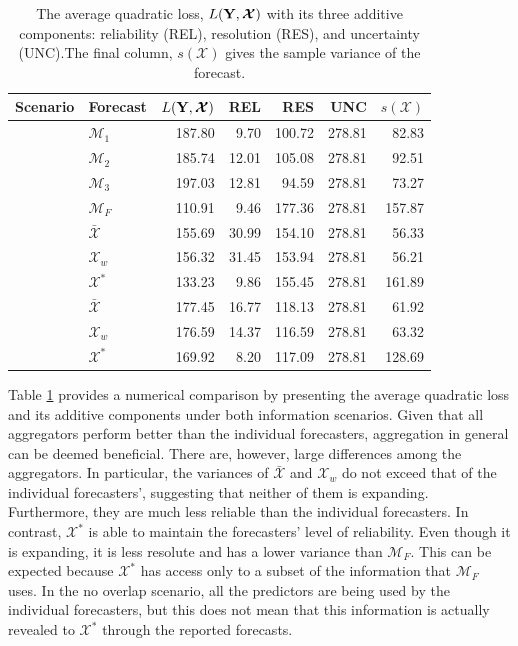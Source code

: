 \documentclass[11pt]{article}
\theoremstyle{definition}
\theoremstyle{definition}
\def\Y{{\bf Y}}
\begin{document}
\begin{table}[h!]
\centering
\caption{The average quadratic loss, $L(\Y,\boldsymbol{\mathcal{X}} )$ with its three additive components: reliability (REL), resolution (RES), and uncertainty (UNC).The final column, $s(\boldsymbol{\mathcal{X}} )$ gives the sample variance of the forecast. } 
\begin{tabular}{llrrrrr}
  \hline \hline
Scenario &  Forecast & $L(\Y,\boldsymbol{\mathcal{X}} )$ & REL & RES & UNC & $s(\boldsymbol{\mathcal{X}} )$\\ 
  \hline
 &  $\mathcal{M}_1$ & 187.80 & 9.70 & 100.72 & 278.81 & 82.83 \\ 
& $\mathcal{M}_2$  & 185.74 & 12.01 & 105.08 & 278.81 & 92.51 \\ 
  & $\mathcal{M}_3$ & 197.03 & 12.81 & 94.59 & 278.81 & 73.27 \\ 
&$\mathcal{M}_F$  & 110.91 & 9.46 & 177.36 & 278.81 & 157.87 \\ \rule{0pt}{2.9ex} 
\multirow{3}{*}{No Overlap} &  $\bar{\mathcal{X}}$ & 155.69 & 30.99 & 154.10 & 278.81 & 56.33 \\ 
 & $\mathcal{X}_w$ & 156.32 & 31.45 & 153.94 & 278.81 & 56.21 \\ 
  &$\mathcal{X}^*$ & 133.23 & 9.86 & 155.45 & 278.81 & 161.89 \\ \rule{0pt}{2.9ex} 
 \multirow{3}{*}{High Overlap}  & $\bar{\mathcal{X}}$ & 177.45 & 16.77 & 118.13 & 278.81 & 61.92 \\ 
  & $\mathcal{X}_w$ & 176.59 & 14.37 & 116.59 & 278.81 & 63.32 \\ 
 & $\mathcal{X}^*$ & 169.92 & 8.20 & 117.09 & 278.81 & 128.69 \\ 
\hline
\end{tabular}
\label{NoTbl}
\end{table}



Table \ref{NoTbl} provides a numerical comparison by presenting the average quadratic loss and its additive components under both information scenarios. Given that all aggregators perform better than the individual forecasters, aggregation in general can be deemed beneficial. There are, however, large differences among the aggregators. In particular, the variances of $\bar{\mathcal{X}}$ and $\mathcal{X}_w$  do not exceed that of the individual forecasters', suggesting that neither of them is expanding. Furthermore, they are much less reliable than the individual forecasters. In contrast, $\mathcal{X}^*$ is able to maintain the forecasters' level of reliability. Even though it is expanding, it is less resolute and has a lower variance than $\mathcal{M}_F$. This can be expected because $\mathcal{X}^*$ has access only to a subset of the information that $\mathcal{M}_F$ uses. In the no overlap scenario, all the predictors are being used by the individual forecasters, but this does not mean that this information is actually revealed to $\mathcal{X}^*$ through the reported forecasts. 
\end{document}
